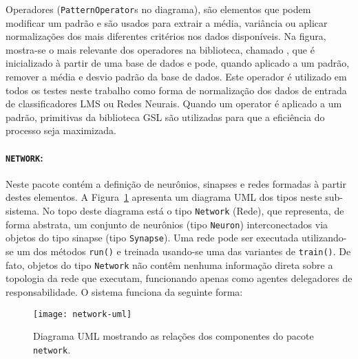 Operadores (\texttt{PatternOperator}s no diagrama), são elementos que podem
modificar um padrão e são usados para extrair a média, variância ou aplicar
normalizações dos mais diferentes critérios nos dados disponíveis. Na figura,
mostra-se o mais relevante dos operadores na biblioteca, chamado
, que é inicializado à partir de uma base de dados
e pode, quando aplicado a um padrão, remover a média e desvio padrão da base
de dados. Este operador é utilizado em todos os testes neste trabalho como
forma de normalização dos dados de entrada de classificadores LMS ou Redes
Neurais. Quando um operator é aplicado a um padrão, primitivas da biblioteca
GSL são utilizadas para que a eficiência do processo seja maximizada.

\paragraph{\texttt{NETWORK}:} Neste pacote contém a definição de
neurônios, sinapses e redes formadas à partir destes elementos. A
Figura~\ref{fig:network-uml} apresenta um diagrama UML dos tipos neste
sub-sistema. No topo deste diagrama está o tipo \texttt{Network} (Rede), que
representa, de forma abstrata, um conjunto de neurônios (tipo \texttt{Neuron})
interconectados via objetos do tipo sinapse (tipo \texttt{Synapse}). Uma rede
pode ser executada utilizando-se um dos métodos \texttt{run()} e treinada
usando-se uma das variantes de \texttt{train()}. De fato, objetos do tipo
\texttt{Network} não contêm nenhuma informação direta sobre a topologia da
rede que executam, funcionando apenas como agentes delegadores de
responsabilidade. O sistema funciona da seguinte forma:

\begin{figure}
\begin{center}
\texttt{[image: network-uml]}
\end{center}
\caption{Diagrama UML mostrando as relações dos componentes do pacote
\texttt{network}.}
\label{fig:network-uml}
\end{figure}

